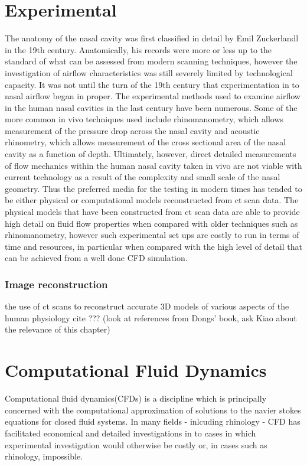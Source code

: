 \section{Experimental}
The anatomy of the nasal cavity was first classified in detail by Emil Zuckerlandl in the 19th century\cite{Stammberger1989}. Anatomically, his records were more or less up to the standard of what can be assessed from modern scanning techniques\cite{Stammberger1989}, however the investigation of airflow characteristics was still severely limited by technological capacity\cite{Eccles2000}. It was not until the turn of the 19th century that experimentation in to nasal airflow began in proper\cite{Eccles2000}. The experimental methods used to examine airflow in the human nasal cavities in the last century have been numerous. Some of the more common in vivo techniques used include rhinomanometry, which allows measurement of the pressure drop across the nasal cavity\cite{Hilberg1989} and acoustic rhinometry, which allows measurement of the cross sectional area of the nasal cavity as a function of depth\cite{Hilberg1989}. Ultimately, however, direct detailed measurements of flow mechanics within the human nasal cavity taken in vivo are not viable with current technology as a result of the complexity and small scale of the nasal geometry\cite{Doorly2008c}. Thus the preferred media for the testing in modern times has tended to be either physical or computational models reconstructed from ct scan data\cite{Doorly2008c}. The physical models that have been constructed from ct scan data are able to provide high detail on fluid flow properties when compared with older techniques such as rhinomanometry\cite{Ma2009}, however such experimental set ups are costly to run in terms of time and resources, in particular when compared with the high level of detail that can be achieved from a well done CFD simulation\cite{Ma2009}.

\subsubsection{Image reconstruction}
the use of ct scans to reconstruct accurate 3D models of various aspects of the human physiology cite ??? (look at references from Dongs' book, ask Kiao about the relevance of this chapter)

\section{Computational Fluid Dynamics}
Computational fluid dynamics(CFDs) is a discipline which is principally concerned with the computational approximation of solutions to the navier stokes equations for closed fluid systems\cite{Tu2008}. In many fields - inlcuding rhinology - CFD has facilitated economical and detailed investigations in to cases in which experimental investigation would otherwise be costly or, in cases such as rhinology, impossible\cite{Keyhani1995}.

